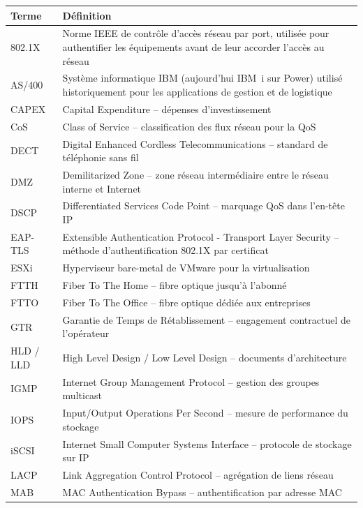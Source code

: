 \documentclass[12pt,a4paper]{report}
\begin{document}
\begin{longtable}{p{3.5cm}p{10cm}}
\toprule
\textbf{Terme} & \textbf{Définition} \\
\midrule
\endhead
802.1X & Norme IEEE de contrôle d'accès réseau par port, utilisée pour authentifier les équipements avant de leur accorder l'accès au réseau \\
\addlinespace
AS/400 & Système informatique IBM (aujourd'hui IBM~i sur Power) utilisé historiquement pour les applications de gestion et de logistique \\
\addlinespace
CAPEX & Capital Expenditure -- dépenses d'investissement \\
\addlinespace
CoS & Class of Service -- classification des flux réseau pour la QoS \\
\addlinespace
DECT & Digital Enhanced Cordless Telecommunications -- standard de téléphonie sans fil \\
\addlinespace
DMZ & Demilitarized Zone -- zone réseau intermédiaire entre le réseau interne et Internet \\
\addlinespace
DSCP & Differentiated Services Code Point -- marquage QoS dans l'en-tête IP \\
\addlinespace
EAP-TLS & Extensible Authentication Protocol - Transport Layer Security -- méthode d'authentification 802.1X par certificat \\
\addlinespace
ESXi & Hyperviseur bare-metal de VMware pour la virtualisation \\
\addlinespace
FTTH & Fiber To The Home -- fibre optique jusqu'à l'abonné \\
\addlinespace
FTTO & Fiber To The Office -- fibre optique dédiée aux entreprises \\
\addlinespace
GTR & Garantie de Temps de Rétablissement -- engagement contractuel de l'opérateur \\
\addlinespace
HLD / LLD & High Level Design / Low Level Design -- documents d'architecture \\
\addlinespace
IGMP & Internet Group Management Protocol -- gestion des groupes multicast \\
\addlinespace
IOPS & Input/Output Operations Per Second -- mesure de performance du stockage \\
\addlinespace
iSCSI & Internet Small Computer Systems Interface -- protocole de stockage sur IP \\
\addlinespace
LACP & Link Aggregation Control Protocol -- agrégation de liens réseau \\
\addlinespace
MAB & MAC Authentication Bypass -- authentification par adresse MAC \\

\end{longtable}
\end{document}
